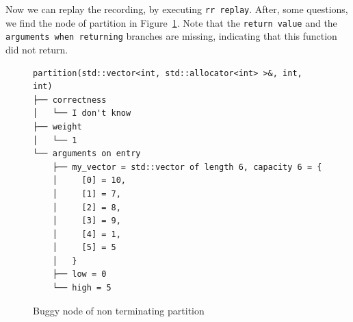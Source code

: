 Now we can replay the recording, by executing \verb|rr replay|.
After, some questions, we find the node of partition in Figure~\ref{fig:nonTerminatingPartitionNode}. Note that the \verb|return value| and the \verb|arguments when returning| branches are missing, indicating that this function did not return. 
\begin{figure}
\centering
\caption{Buggy node of non terminating partition}
\label{fig:nonTerminatingPartitionNode}
\begin{verbatim}
partition(std::vector<int, std::allocator<int> >&, int, int)                                                                                          
├── correctness                                                                                                                                       
│   └── I don't know                                                                                                                                  
├── weight                                                                                                                                            
│   └── 1                                                                                                                                             
└── arguments on entry                                                                                                                                
    ├── my_vector = std::vector of length 6, capacity 6 = {                                                                                           
    │     [0] = 10,                                                                                                                                   
    │     [1] = 7,                                                                                                                                    
    │     [2] = 8,                                                                                                                                    
    │     [3] = 9,                                                                                                                                    
    │     [4] = 1,                                                                                                                                    
    │     [5] = 5                                                                                                                                     
    │   }                                                                                                                                             
    ├── low = 0                                                                                                                                       
    └── high = 5
\end{verbatim}
\end{figure}


